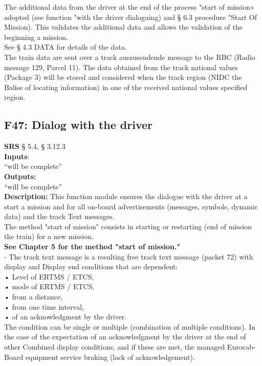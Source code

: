 \documentclass{template/openetcs_report}
\begin{document}
The additional data from the driver at the end of the process "start of mission» 
adopted (see function "with the driver dialoguing) and § 6.3 procedure 
"Start Of Mission). This validates the additional data and allows the validation of the beginning 
a mission. \\

See § 4.3 DATA for details of the data. \\
The train data are sent over a track auszusendende message to the RBC 
(Radio message 129, Parcel 11). 
The data obtained from the track national values ​​(Package 3) will be stored and 
considered when the track region (NIDC the Balise of locating information) in one of the 
received national values ​​specified region.\\

\subsection {F47: Dialog with the driver}
\textbf{SRS} § 5.4, § 3.12.3\\

\textbf{Inputs}:\\
``will be complete''\\
 
 \textbf{Outputs:}\\
 ``will be complete''\\
 
 \textbf{Description:} 
This function module ensures the dialogue with the driver at a start 
a mission and for all on-board advertisements (messages, symbols, dynamic data) and the track 
Text messages. \\

The method "start of mission" consists in starting or restarting (end of mission 
the train) for a new mission. \\

\textbf{See Chapter 5 for the method "start of mission."} \\

- The track text message is a resulting free track text message (packet 72) with display and
Display end conditions that are dependent: \\
    • Level of ERTMS / ETCS, \\
    • mode of ERTMS / ETCS, \\
    • from a distance, \\
    • from one time interval, \\ 
    • of an acknowledgment by the driver. \\
The condition can be single or multiple (combination of multiple conditions). 
In the case of the expectation of an acknowledgment by the driver at the end of other 
Combined display conditions, and if these are met, the managed Eurocab- 
Board equipment service braking (lack of acknowledgement). \\
\end{document}
